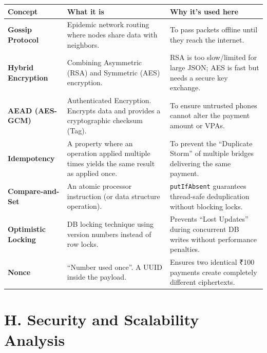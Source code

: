 \documentclass[11pt, a4paper]{article}
\begin{document}
\begin{table}[h]
\centering
\begin{tabularx}{\textwidth}{|>{\bfseries}l|X|X|}
\hline
Concept & What it is & Why it's used here \\ \hline
Gossip Protocol & Epidemic network routing where nodes share data with neighbors. & To pass packets offline until they reach the internet. \\ \hline
Hybrid Encryption & Combining Asymmetric (RSA) and Symmetric (AES) encryption. & RSA is too slow/limited for large JSON; AES is fast but needs a secure key exchange. \\ \hline
AEAD (AES-GCM) & Authenticated Encryption. Encrypts data and provides a cryptographic checksum (Tag). & To ensure untrusted phones cannot alter the payment amount or VPAs. \\ \hline
Idempotency & A property where an operation applied multiple times yields the same result as applied once. & To prevent the ``Duplicate Storm'' of multiple bridges delivering the same payment. \\ \hline
Compare-and-Set & An atomic processor instruction (or data structure operation). & \texttt{putIfAbsent} guarantees thread-safe deduplication without blocking locks. \\ \hline
Optimistic Locking & DB locking technique using version numbers instead of row locks. & Prevents ``Lost Updates'' during concurrent DB writes without performance penalties. \\ \hline
Nonce & ``Number used once''. A UUID inside the payload. & Ensures two identical ₹100 payments create completely different ciphertexts. \\ \hline
\end{tabularx}
\end{table}

\section*{H. Security and Scalability Analysis}
\end{document}
